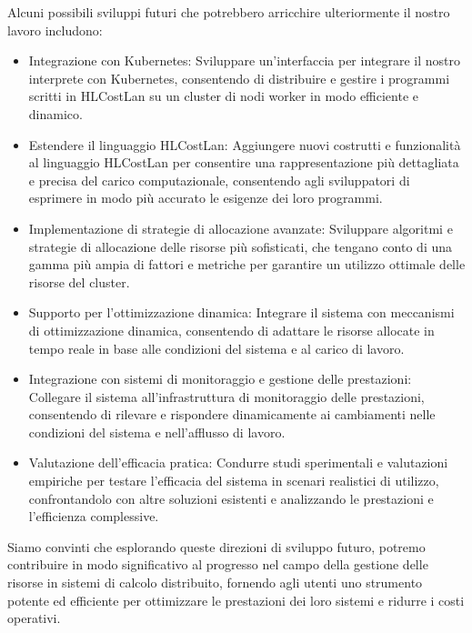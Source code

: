 \documentclass[../../main.tex]{subfiles}
\begin{document}
Alcuni possibili sviluppi futuri che potrebbero arricchire ulteriormente il nostro lavoro includono:
\begin{itemize}
    \item Integrazione con Kubernetes: Sviluppare un'interfaccia per integrare il nostro interprete con Kubernetes, consentendo di distribuire e gestire i programmi scritti in HLCostLan su un cluster di nodi worker in modo efficiente e dinamico.
    \item Estendere il linguaggio HLCostLan: Aggiungere nuovi costrutti e funzionalità al linguaggio HLCostLan per consentire una rappresentazione più dettagliata e precisa del carico computazionale, consentendo agli sviluppatori di esprimere in modo più accurato le esigenze dei loro programmi.
    \item Implementazione di strategie di allocazione avanzate: Sviluppare algoritmi e strategie di allocazione delle risorse più sofisticati, che tengano conto di una gamma più ampia di fattori e metriche per garantire un utilizzo ottimale delle risorse del cluster.
    \item Supporto per l'ottimizzazione dinamica: Integrare il sistema con meccanismi di ottimizzazione dinamica, consentendo di adattare le risorse allocate in tempo reale in base alle condizioni del sistema e al carico di lavoro.
    \item  Integrazione con sistemi di monitoraggio e gestione delle prestazioni: Collegare il sistema all'infrastruttura di monitoraggio delle prestazioni, consentendo di rilevare e rispondere dinamicamente ai cambiamenti nelle condizioni del sistema e nell'afflusso di lavoro.
    \item Valutazione dell'efficacia pratica: Condurre studi sperimentali e valutazioni empiriche per testare l'efficacia del sistema in scenari realistici di utilizzo, confrontandolo con altre soluzioni esistenti e analizzando le prestazioni e l'efficienza complessive.
\end{itemize}

Siamo convinti che esplorando queste direzioni di sviluppo futuro, potremo contribuire in modo significativo al progresso nel campo della gestione delle risorse in sistemi di calcolo distribuito, fornendo agli utenti uno strumento potente ed efficiente per ottimizzare le prestazioni dei loro sistemi e ridurre i costi operativi.
\end{document}
